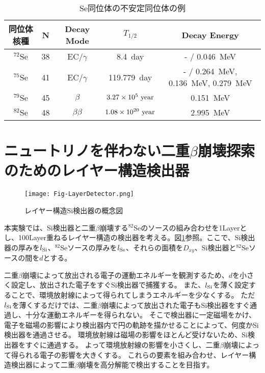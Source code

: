 \documentclass[a4paper,10pt]{jreport}
\begin{document}
\begin{table}[H] 
	\center
	\caption{Se同位体の不安定同位体の例} \label{Tab-SeIsotope}
	\begin{tabular}{ccccc}
		\hline
		同位体核種 & N & Decay Mode & $T_{1/2}$ & Decay Energy \\
		\hline
		$^{72}$Se & 38 & EC/$\gamma$ & \SI{8.4}{day} & - / \SI{0.046}{MeV} \\
		$^{75}$Se & 41 & EC/$\gamma$ & \SI{119.779}{day}  & - / \SI{0.264}{MeV}, \SI{0.136}{MeV}, \SI{0.279}{MeV} \\
		$^{79}$Se & 45 & $\beta$ & $3.27\times10^{5}\ \rm{year}$ & \SI{0.151}{MeV} \\
		$^{82}$Se & 48 & $\beta\beta$ & $1.08\times10^{20}\ \rm{year}$ & \SI{2.995}{MeV} \\
		\hline
	\end{tabular}
\end{table}



\section{ニュートリノを伴わない二重$\beta$崩壊探索のためのレイヤー構造検出器}

\begin{figure}[H]
	\center
	\texttt{[image: Fig-LayerDetector.png]}
	\caption{レイヤー構造Si検出器の概念図} \label{Fig-LayerDetector}
\end{figure}

本実験では、Si検出器と二重$\beta$崩壊する$^{82}$Seのソースの組み合わせを1Layerとし、100Layer重ねるレイヤー構造の検出器を考える。図\ref{Fig-LayerDetector}参照。ここで、Si検出器の厚みを$l_{\rm{Si}}$、$^{82}$Seソースの厚みを$l_{\rm{Se}}$、それらの面積を$D_{xy}$、Si検出器と$^{82}$Seソースの間を$d$とする。

二重$\beta$崩壊によって放出される電子の運動エネルギーを観測するため、$d$を小さく設定し、放出された電子をすぐSi検出器で捕獲する。
また、$l_{\rm{Si}}$を薄く設定することで、環境放射線によって得られてしまうエネルギーを少なくする。
ただ$l_{\rm{Si}}$を薄くするだけでは、二重$\beta$崩壊によって放出された電子もSi検出器をすぐ通過し、十分な運動エネルギーを得られない。
そこで検出器に一定磁場をかけ、電子を磁場の影響により検出器内で円の軌跡を描かせることによって、何度かSi検出器を通過させる。
環境放射線は磁場の影響をほとんど受けないため、Si検出器をすぐに通過する。
よって環境放射線の影響を小さくし、二重$\beta$崩壊によって得られる電子の影響を大きくする。
これらの要素を組み合わせ、レイヤー構造検出器によって二重$\beta$崩壊を高分解能で検出することを目指す。
\end{document}
